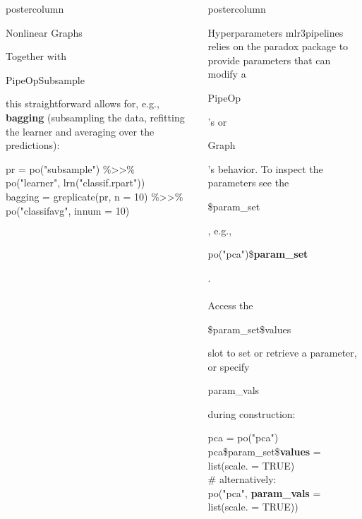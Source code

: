 \documentclass{beamer}
\newlength{\columnheight} %
\newcommand{\codeinline}[1]{\begin{codeboxinline}#1\end{codeboxinline}}
\begin{document}
\begin{frame}[fragile]{}
\begin{columns}
\begin{column}{.245\textwidth}
\begin{beamercolorbox}[center]{postercolumn}
\begin{minipage}{.98\textwidth}
{\begin{myblock}{Nonlinear Graphs}
\begin{center}
              \end{center}
              Together with \codeinline{PipeOpSubsample} this straightforward allows for, e.g., \textbf{bagging} (subsampling the data, refitting the learner and averaging over the predictions):
              \begin{codeboxexample}
						    {\footnotesize
                  pr = po("subsample") \%>{}>\%\\
                  \hspace*{1ex} po("learner", lrn("classif.rpart"))\\
                  bagging = greplicate(pr, n = 10) \%>{}>\%\\
                  \hspace*{1ex} po("classifavg", innum = 10)}
					    \end{codeboxexample}
            \end{myblock}
						\vfill}
				\end{minipage}
			\end{beamercolorbox}
		\end{column}
    \begin{column}{.245\textwidth}
			\begin{beamercolorbox}[center]{postercolumn}
				\begin{minipage}{.98\textwidth}
					\parbox[t][\columnheight]{\textwidth}{
            \begin{myblock}{Hyperparameters}
              mlr3pipelines relies on the paradox package to provide parameters that can modify a \codeinline{PipeOp}'s or \codeinline{Graph}'s behavior. To inspect the parameters see the \codeinline{\$param\_set}, e.g., \codeinline{po("pca")\$\textbf{param\_set}}.\\
              \ \\
              Access the \codeinline{\$param\_set\$values} slot to set or retrieve a parameter, or specify \codeinline{param\_vals} during construction:
              \begin{codeboxmultiline}[width=24cm]
                {\footnotesize pca = po("pca") \\
                pca\$param\_set\$\textbf{values} = list(scale. = TRUE) \\
                \# alternatively:\\
                po("pca", \textbf{param\_vals} = list(scale. = TRUE))}
              \end{codeboxmultiline}
              \ \\

\end{myblock}}
\end{minipage}
\end{beamercolorbox}
\end{column}
\end{columns}
\end{frame}
\end{document}

